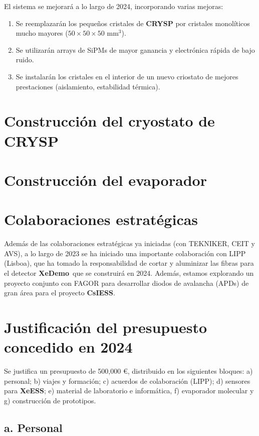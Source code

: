 \documentclass[12pt,a4paper,article]{report} %
\def\xess{{\bf XeESS}}
\def\cess{{\bf CsIESS}}
\def\xed{{\bf XeDemo}}
\def\crysp{{\bf CRYSP }}
\begin{document}
El sistema se mejorará a lo largo de 2024, incorporando varias mejoras:

\begin{enumerate}
\item Se reemplazarán los pequeños cristales de \crysp por cristales monolíticos mucho mayores ($50 \times 50 \times 50$ mm$^3$).
\item Se utilizarán arrays de SiPMs de mayor ganancia y electrónica rápida de bajo ruido.  
\item Se instalarán los cristales en el interior de un nuevo criostato de mejores prestaciones (aislamiento, estabilidad térmica). 
\end{enumerate}

\section*{Construcción del cryostato de CRYSP}

\section*{Construcción del evaporador}




\section*{Colaboraciones estratégicas}

Además de las colaboraciones estratégicas ya iniciadas (con TEKNIKER, CEIT y AVS), a lo largo de 2023 se ha iniciado una importante colaboración con LIPP (Lisboa), que ha tomado la responsabilidad de cortar y aluminizar las fibras para el detector \xed\ que se construirá en 2024. Además, estamos explorando un proyecto conjunto con FAGOR para  
desarrollar diodos de avalancha (APDs) de gran área para el proyecto \cess.  
 

\section*{Justificación del presupuesto concedido en 2024}

Se justifica un presupuesto de 500,000 \euro, distribuido en los siguientes bloques: a) personal; b) viajes y formación; c) acuerdos de colaboración (LIPP);  d) sensores para \xess; e) material de laboratorio e informática, f) evaporador molecular y g) construcción de prototipos. 

 \subsection*{a. Personal}
 
\end{document}

